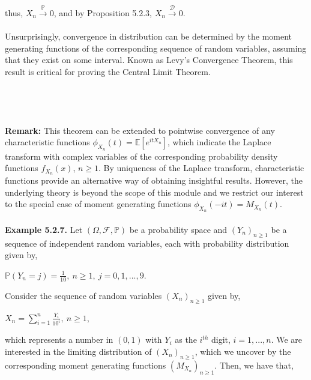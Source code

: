 \documentclass{article}
\begin{document}
thus, $X_n \xrightarrow{\mathbb{P}} 0$, and by Proposition 5.2.3, $X_n \xrightarrow{\mathcal{D}} 0$.\\\\
Unsurprisingly, convergence in distribution can be determined by the moment generating functions of the corresponding sequence of random variables, assuming that they exist on some interval. Known as Levy's Convergence Theorem, this result is critical for proving the Central Limit Theorem.\\\\
\noindent{}\\\\\\
\textbf{Remark:} This theorem can be extended to pointwise convergence of any characteristic functions $\phi_{X_n}(t) = \mathbb{E}[e^{itX_n}]$, which indicate the Laplace transform with complex variables of the corresponding probability density functions $f_{X_n}(x)$, $n \geq 1$. By uniqueness of the Laplace transform, characteristic functions provide an alternative way of obtaining insightful results. However, the underlying theory is beyond the scope of this module and we restrict our interest to the special case of moment generating functions $\phi_{X_n}(-it) = M_{X_n}(t)$.\\\\
\textbf{Example 5.2.7.} Let $(\Omega,\mathcal{F},\mathbb{P})$ be a probability space and $(Y_n)_{n\geq1}$ be a sequence of independent random variables, each with probability distribution given by,
\begin{center}
	$\mathbb{P}(Y_n = j) = \frac{1}{10}, \ n\geq1, \ j = 0,1,...,9$.
\end{center}
Consider the sequence of random variables $(X_n)_{n\geq1}$ given by,
\begin{center}
	$X_n = \sum_{i=1}^{n}\frac{Y_i}{10^i}, \ n\geq1$,
\end{center}
which represents a number in $(0,1)$ with $Y_i$ as the $i^{th}$ digit, $i=1,...,n$. We are interested in the limiting distribution of $(X_n)_{n\geq1}$, which we uncover by the corresponding moment generating functions $(M_{X_n})_{n\geq1}$. Then, we have that,
\end{document}
